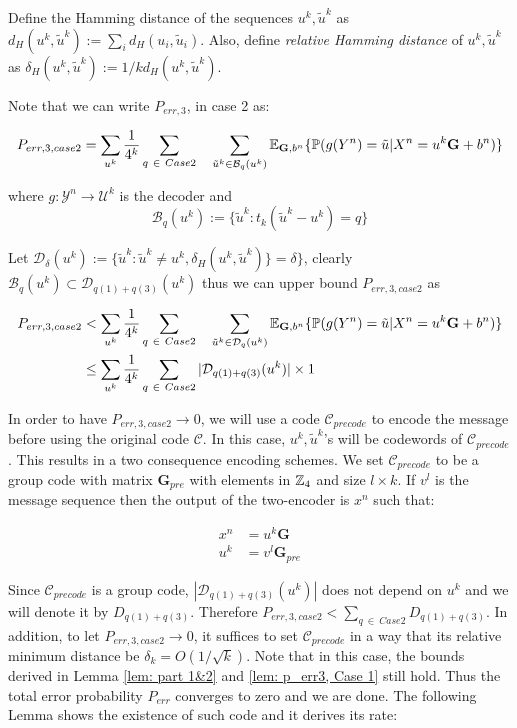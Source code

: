 Define the Hamming distance of the sequences $u^k,\tilde{u}^k$ as $d_H(u^k,\tilde{u}^k):= \sum_i d_H(u_i,\tilde{u}_i)$. Also, define \textit{relative Hamming distance} of $u^k,\tilde{u}^k$ as  $\delta_H(u^k,\tilde{u}^k):=1/k d_H(u^k,\tilde{u}^k)$. 

Note that we can write $P_{err,3}$, in case 2 as: 

\begin{align*}
P_{err,3, case 2}=\sum_{u^k} \frac{1}{4^k}  \sum_{q~\in~ Case 2 } \quad\sum_{\tilde{u}^k \in\mathcal{ B}_q(u^k)} \mathbb{E}_{\mathbf{G},b^n}\{\mathbb{P}(g(Y^n)=\tilde{u}|X^n=u^k \mathbf{G}+b^n)\}
\end{align*}

where $g:\mathcal{Y}^n\rightarrow \mathcal{U}^k$ is the decoder and 
$$\mathcal{ B}_q(u^k):=\{\tilde{u}^k : t_k(\tilde{u}^k-u^k)=q \}$$

Let $\mathcal{D}_\delta(u^k):=\{\tilde{u}^k: \tilde{u}^k \neq u^k, \delta_H(u^k,\tilde{u}^k)\}=\delta\}$, clearly $\mathcal{ B}_q(u^k) \subset \mathcal{D}_{q(1)+q(3)}(u^k)$ thus we can upper bound $P_{err,3, case 2}$ as

\begin{align*}
P_{err,3, case 2}&<\sum_{u^k} \frac{1}{4^k}  \sum_{q~\in~ Case 2 } \quad\sum_{\tilde{u}^k \in\mathcal{ D}_q(u^k)} \mathbb{E}_{\mathbf{G},b^n}\{\mathbb{P}(g(Y^n)=\tilde{u}|X^n=u^k \mathbf{G}+b^n)\}\\
&\leq \sum_{u^k} \frac{1}{4^k}  \sum_{q~\in~ Case 2 } |\mathcal{D}_{q(1)+q(3)}(u^k)| \times 1
\end{align*}

In order to have $P_{err,3, case 2}\rightarrow 0$, we will use a code $\mathcal{C}_{precode}$ to encode the message before using the original code $\mathcal{C}$. In this case, $u^k, \tilde{u}^k$'s will be codewords of   $\mathcal{C}_{precode}$ .  This results in a two consequence encoding schemes. We set $\mathcal{C}_{precode}$ to be a group code with matrix $\mathbf{G}_{pre}$ with elements in  $\mathbb{Z}_4$ and size $l\times k$. If $v^l$ is the message sequence then the output of the two-encoder is $x^n$ such that:

\begin{align*}
x^n&=u^k\mathbf{G}\\
u^k&=v^l\mathbf{G}_{pre}
\end{align*} 

Since $\mathcal{C}_{precode}$ is a group code, $|\mathcal{D}_{q(1)+q(3)}(u^k)|$ does not depend on $u^k$ and we will denote it by $D_{q(1)+q(3)}$. Therefore $P_{err,3, case 2}< \sum_{q~\in~ Case 2 } D_{q(1)+q(3)}$. In addition, to let  $P_{err,3, case 2}\rightarrow 0$, it suffices to set $\mathcal{C}_{precode}$ in a way that its relative minimum distance be $\delta_k = O(1/\sqrt{k})$.  Note that in this case, the bounds derived in Lemma \ref{lem: part 1&2} and  \ref{lem: p_err3, Case 1} still hold. Thus the total error probability $P_{err}$ converges to zero and we are done. The following Lemma shows the existence of such code and it derives its rate:

